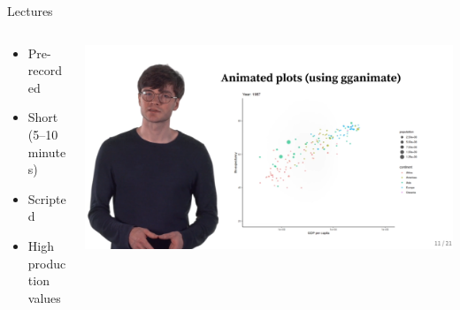 \begin{frame}{Lectures}
  \begin{columns}[c,onlytextwidth]
    \begin{column}{0.5\linewidth}
      \begin{itemize}
        \item Pre-recorded
        \item Short (5--10 minutes)
        \item Scripted
        \item High production values
      \end{itemize}
    \end{column}
    \begin{column}{0.5\linewidth}
      \includegraphics[width=\textwidth]{figures/lecture.png}
    \end{column}
  \end{columns}
\end{frame}

